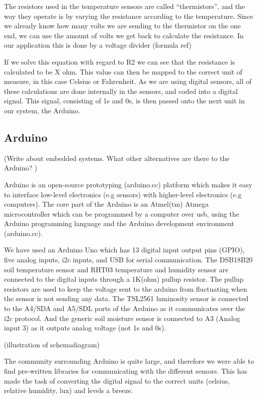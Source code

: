 The resistors used in the temperature sensors are called “thermistors”, and the way they operate is by varying the resistance according to the temperature. Since we already know how many volts we are sending to the thermistor on the one end, we can use the amount of volts we get back to calculate the resistance. In our application this is done by a voltage divider (formula ref)

If we solve this equation with regard to R2 we can see that the resistance is calculated to be X ohm. This value can then be mapped to the correct unit of measure, in this case Celsius or Fahrenheit. 
As we are using digital sensors, all of these calculations are done internally in the sensors, and coded into a digital signal. This signal, consisting of 1s and 0s, is then passed onto the next unit in our system, the Arduino.  

\subsection{Arduino}
(Write about embedded systems. What other alternatives are there to the Arduino? )

Arduino is an open-source prototyping (arduino.cc) platform which makes it easy to interface low-level electronics (e.g sensors) with higher-level electronics (e.g computers). The core part of the Arduino is an Atmel(tm) Atmega microcontroller which can be programmed by a computer over usb, using the Arduino programming language and the Arduino development environment (arduino.cc).

We have used an Arduino Uno which has 13 digital input output pins (GPIO), five analog inputs, i2c inputs, and USB for serial communication. The DSB18B20 soil temperature sensor and RHT03 temperature and humidity sensor are connected to the digital inputs through a 1K(ohm) pullup resistor. The pullup resistors are used to keep the voltage sent to the arduino from fluctuating when the sensor is not sending any data. The TSL2561 luminosity sensor is connected to the A4/SDA and A5/SDL ports of the Arduino as it communicates over the i2c protocol. And the generic soil moisture sensor is connected to A3 (Analog input 3) as it outputs analog voltage (not 1s and 0s).  

(illustration of schemadiagram)

The community surrounding Arduino is quite large, and therefore we were able to find pre-written libraries for communicating with the different sensors. This has made the task of converting the digital signal to the correct units (celsius, relative humidity, lux) and levels a breeze. 

